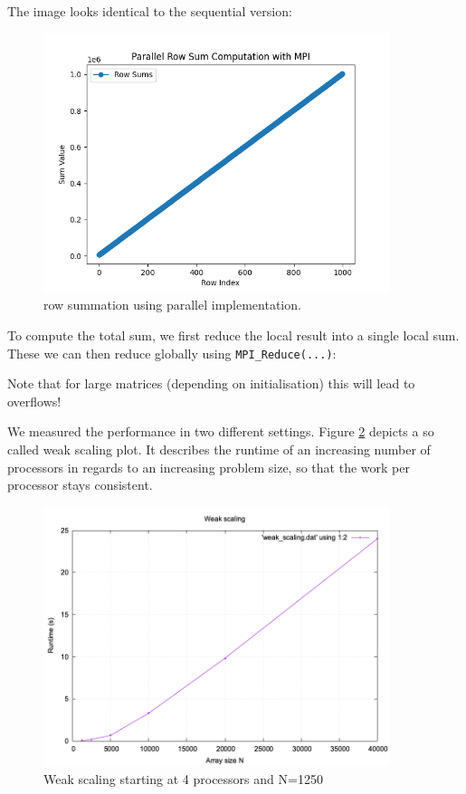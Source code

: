 \documentclass[a4paper,10pt]{article}
\begin{document}
The image looks identical to the sequential version:
\begin{figure}[H]
  \centering
  \includegraphics[width=0.9\textwidth]{img/ex2_para}
  \caption{row summation using parallel implementation.}
  \label{fig:ex2_seq}
\end{figure}

To compute the total sum, we first reduce the local result into a single local sum.
These we can then reduce globally using \verb|MPI_Reduce(...)|:

Note that for large matrices (depending on initialisation) this will lead to overflows!

We measured the performance in two different settings.
Figure \ref{fig:ex2_weak_scaling} depicts a so called weak scaling plot.
It describes the runtime of an increasing number of processors in regards to an increasing problem size, so that the work per processor stays consistent.

\begin{figure}[H]
  \centering
  \includegraphics[width=0.9\textwidth]{img/ex2_weak_scaling}
  \caption{Weak scaling starting at 4 processors and N=1250}
  \label{fig:ex2_weak_scaling}
\end{figure}
\end{document}
